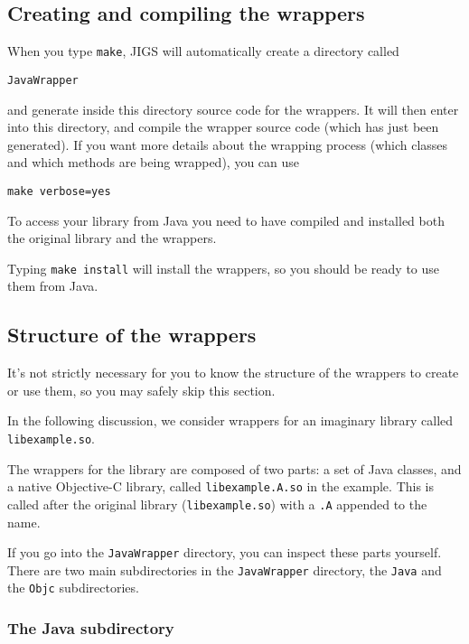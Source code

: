\subsection{Creating and compiling the wrappers}

When you type \texttt{make}, JIGS will automatically create a
directory called
\begin{verbatim}
JavaWrapper
\end{verbatim}
and generate inside this directory source code for the wrappers.  It
will then enter into this directory, and compile the wrapper source
code (which has just been generated).  If you want more details about
the wrapping process (which classes and which methods are being
wrapped), you can use
\begin{verbatim}
make verbose=yes
\end{verbatim}

To access your library from Java you need to have compiled and
installed both the original library and the wrappers.

Typing \texttt{make install} will install the wrappers, so you should
be ready to use them from Java.

\subsection{Structure of the wrappers}\label{wrapper-structure}

It's not strictly necessary for you to know the structure of the
wrappers to create or use them, so you may safely skip this section.

In the following discussion, we consider wrappers for an imaginary
library called \texttt{libexample.so}.

The wrappers for the library are composed of two parts: a set of Java
classes, and a native Objective-C library, called
\texttt{libexample.A.so} in the example.  This is called after the 
original library (\texttt{libexample.so}) with a \texttt{.A} appended
to the name.

If you go into the \texttt{JavaWrapper} directory, you can inspect
these parts yourself.  There are two main subdirectories in the
\texttt{JavaWrapper} directory, the \texttt{Java} and the
\texttt{Objc} subdirectories.

\subsubsection{The Java subdirectory}

